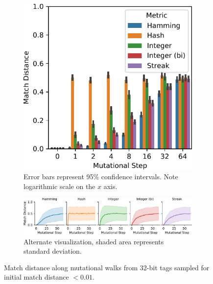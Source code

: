\begin{figure}
\begin{center}

\begin{subfigure}{\textwidth}
\includegraphics[width=\textwidth]{img/mutational_walk_sampled_start/bitweight=0dot5+seed=1+title=mutational_walk_barplot+_data_hathash_hash=05b961e08b5b7854+_script_fullcat_hash=982405ca713eba73+ext=}
\caption{
Error bars represent 95\% confidence intervals.
Note logarithmic scale on the $x$ axis.
}
\label{fig:mutational_walk_sampled_start_barplot}
\end{subfigure}

\begin{subfigure}{\textwidth}
\includegraphics[width=\textwidth]{img/mutational_walk_sampled_start/bitweight=0dot5+seed=1+title=mutational_walk_lineplot+_data_hathash_hash=05b961e08b5b7854+_script_fullcat_hash=982405ca713eba73+ext=.pdf}
\caption{
Alternate visualization, shaded area represents standard deviation.
}
\end{subfigure}

\caption{
Match distance along mutational walks from 32-bit tags sampled for initial match distance $<0.01$.
}
\label{fig:mutational_walk_sampled_start}

\end{center}
\end{figure}
